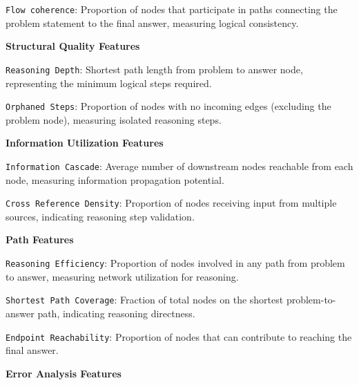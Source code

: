 \texttt{Flow coherence}: Proportion of nodes that participate in paths connecting the problem statement to the final answer, measuring logical consistency.

\textbf{Structural Quality Features}


\texttt{Reasoning Depth}: Shortest path length from problem to answer node, representing the minimum logical steps required.

\texttt{Orphaned Steps}: Proportion of nodes with no incoming edges (excluding the problem node), measuring isolated reasoning steps.


\textbf{Information Utilization Features}

\texttt{Information Cascade}: Average number of downstream nodes reachable from each node, measuring information propagation potential.

\texttt{Cross Reference Density}: Proportion of nodes receiving input from multiple sources, indicating reasoning step validation.


\textbf{Path Features}


\texttt{Reasoning Efficiency}: Proportion of nodes involved in any path from problem to answer, measuring network utilization for reasoning.

\texttt{Shortest Path Coverage}: Fraction of total nodes on the shortest problem-to-answer path, indicating reasoning directness.


\texttt{Endpoint Reachability}: Proportion of nodes that can contribute to reaching the final answer.


\textbf{Error Analysis Features}

